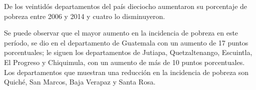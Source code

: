  De los veintidós departamentos del país dieciocho aumentaron su porcentaje de pobreza entre 2006 y 2014 y cuatro lo disminuyeron. 

Se puede observar que el mayor aumento en la incidencia de pobreza  en este período, se dio en el departamento de Guatemala con un aumento de 17 puntos porcentuales; le siguen los departamentos de Jutiapa, Quetzaltenango, Escuintla, El Progreso y Chiquimula, con un aumento de más de 10 puntos porcentuales. Los departamentos que muestran una reducción en la incidencia de  pobreza son Quiché, San Marcos, Baja Verapaz y Santa Rosa. 